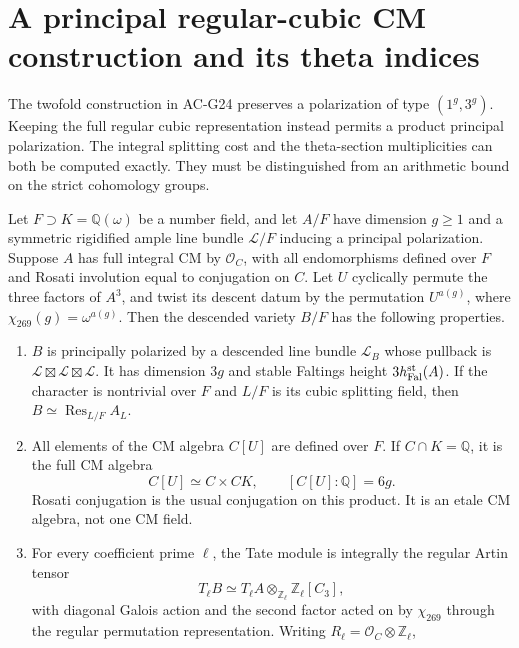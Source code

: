 \section{A principal regular-cubic CM construction and its theta indices}
\label{sec:principal-regular-twist}

The twofold construction in AC-G24 preserves a polarization of
type $(1^g,3^g)$.  Keeping the full regular cubic representation
instead permits a product principal polarization.  The integral
splitting cost and the theta-section multiplicities can both be
computed exactly.  They must be distinguished from an arithmetic
bound on the strict cohomology groups.

\begin{theorem}
\label{AC-G27}
Let $F\supset K=\mathbb Q(\omega)$ be a number field, and let
$A/F$ have dimension $g\geq1$ and a symmetric rigidified ample
line bundle $\mathcal L/F$ inducing a principal polarization.
Suppose $A$ has full integral CM by $\mathcal O_C$, with all
endomorphisms defined over $F$ and Rosati involution equal to
conjugation on $C$.  Let $U$ cyclically permute the three factors
of $A^3$, and twist its descent datum by the permutation
$U^{a(g)}$, where $\chi_{269}(g)=\omega^{a(g)}$.
Then the descended variety $B/F$ has the following properties.
\begin{enumerate}
\item $B$ is principally polarized by a descended line bundle
$\mathcal L_B$ whose pullback is
$\mathcal L\boxtimes\mathcal L\boxtimes\mathcal L$.
It has dimension $3g$ and stable Faltings height
$3h_{\rm Fal}^{\rm st}(A)$.
If the character is nontrivial over $F$ and $L/F$ is its cubic
splitting field, then $B\simeq\operatorname{Res}_{L/F}A_L$.
\item All elements of the CM algebra $C[U]$ are defined over
$F$.  If $C\cap K=\mathbb Q$, it is the full CM algebra
\[
                  C[U]\simeq C\times CK,\qquad
                  [C[U]:\mathbb Q]=6g.                 \tag{G27.1}
\]
Rosati conjugation is the usual conjugation on this product.
It is an etale CM algebra, not one CM field.
\item For every coefficient prime $\ell$, the Tate module is
integrally the regular Artin tensor
\[
 T_\ell B\simeq T_\ell A\otimes_{\mathbb Z_\ell}
                  \mathbb Z_\ell[C_3],                 \tag{G27.2}
\]
with diagonal Galois action and the second factor acted on by
$\chi_{269}$ through the regular permutation representation.
Writing $R_\ell=\mathcal O_C\otimes\mathbb Z_\ell$,

\end{enumerate}
\end{theorem}
